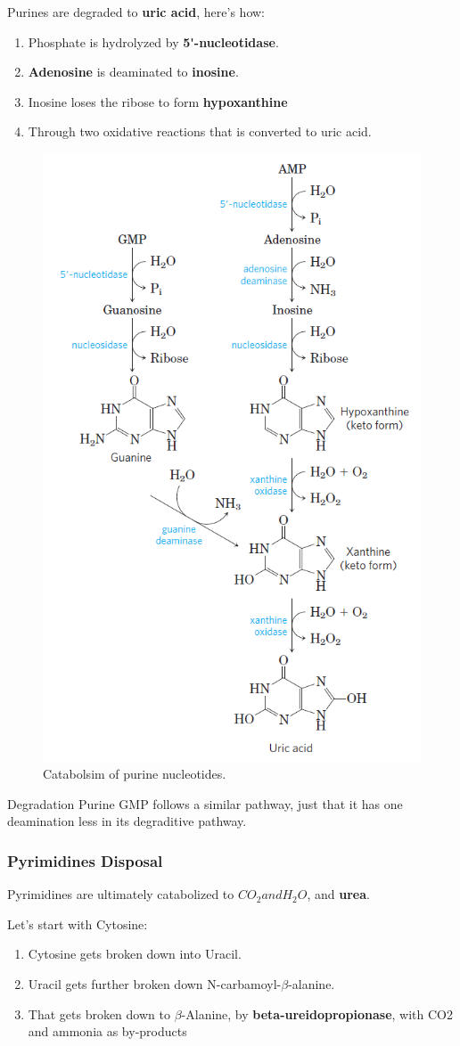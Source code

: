 \documentclass[../main.tex]{subfiles}
\begin{document}
Purines are degraded to \textbf{\gls{uric acid}}, here's how:
\begin{enumerate}
	\item Phosphate is hydrolyzed by \textbf{\gls{5'-nucleotidase}}.
	\item \textbf{\gls{Adenosine}} is deaminated to \textbf{\gls{inosine}}.
	\item Inosine loses the ribose to form \textbf{\gls{hypoxanthine}}
	\item Through two oxidative reactions that is converted to uric acid.
\end{enumerate}

\begin{figure}[H]
	\centering
	\includegraphics[width=0.4\linewidth]{ump_deg}
	\caption{Catabolsim of purine nucleotides.}
	\label{fig:umpdeg}
\end{figure}


\begin{RemarkWithTitel}{Degradation Purine}
	GMP follows a similar pathway, just that it has one deamination less in its degraditive pathway.
\end{RemarkWithTitel}


\subsubsection{Pyrimidines Disposal}

Pyrimidines are ultimately catabolized to $CO_{2} and H_{2}O$, and \textbf{urea}. 

Let's start with Cytosine:
\begin{enumerate}
	\item Cytosine gets broken down into Uracil.
	\item Uracil gets further broken down N-carbamoyl-$\beta$-alanine.
	\item That gets broken down to $\beta$-\gls{Alanine}, by \textbf{\gls{beta-ureidopropionase}}, with CO2 and ammonia as by-products
\end{enumerate}
\end{document}
